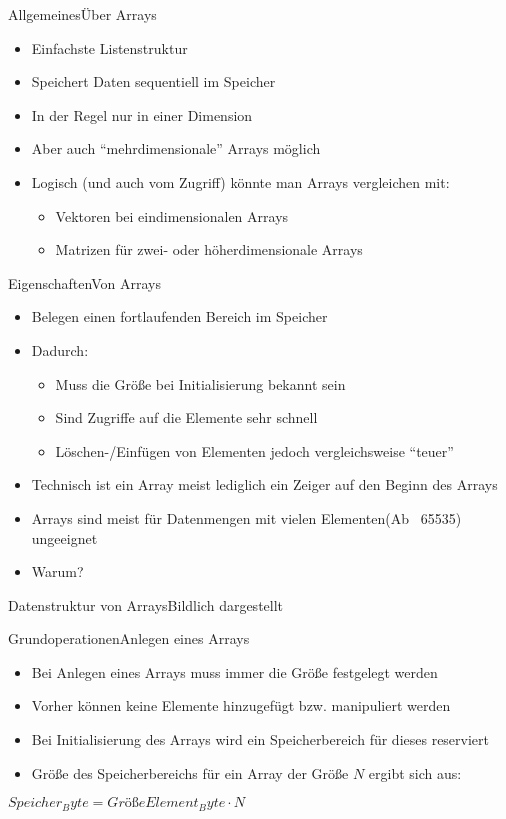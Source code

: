 \begin{frame}{Allgemeines}{Über Arrays}
	\begin{itemize}
		\item Einfachste Listenstruktur
		\item Speichert Daten sequentiell im Speicher
		\item In der Regel nur in einer Dimension
		\item Aber auch "`mehrdimensionale"' Arrays möglich
		\item Logisch (und auch vom Zugriff) könnte man Arrays vergleichen mit:
		\begin{itemize}
			\item Vektoren bei eindimensionalen Arrays
			\item Matrizen für zwei- oder höherdimensionale Arrays
		\end{itemize}
	\end{itemize}
\end{frame}

\begin{frame}{Eigenschaften}{Von Arrays}
	\begin{itemize}
		\item Belegen einen fortlaufenden Bereich im Speicher
		\item Dadurch:
		\begin{itemize}
			\item Muss die Größe bei Initialisierung bekannt sein
			\item Sind Zugriffe auf die Elemente sehr schnell
			\item Löschen-/Einfügen von Elementen jedoch vergleichsweise "`teuer"'
		\end{itemize}
		\item Technisch ist ein Array meist lediglich ein Zeiger auf den Beginn des Arrays
		\item Arrays sind meist für Datenmengen mit vielen Elementen(Ab ~65535) ungeeignet
		\item Warum?
	\end{itemize}
\end{frame}

\begin{frame}{Datenstruktur von Arrays}{Bildlich dargestellt}
\end{frame}

\begin{frame}{Grundoperationen}{Anlegen eines Arrays}
	\begin{itemize}
		\item Bei Anlegen eines Arrays muss immer die Größe festgelegt werden
		\item Vorher können keine Elemente hinzugefügt bzw. manipuliert werden
		\item Bei Initialisierung des Arrays wird ein Speicherbereich für dieses reserviert
		\item Größe des Speicherbereichs für ein Array der Größe $N$ ergibt sich aus:
	\end{itemize}
	$Speicher_Byte=GrößeElement_Byte\cdot N$
\end{frame}

